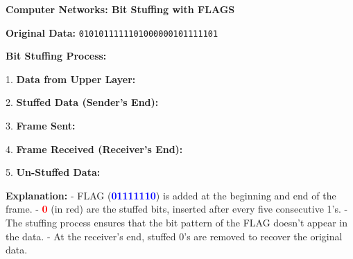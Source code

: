 \documentclass[12pt,a4paper]{article}
\newcommand{\bitstuff}[1]{\textcolor{red}{\textbf{#1}}}
\newcommand{\flag}[1]{\textcolor{blue}{\textbf{#1}}}
\begin{document}
\begin{center}
\textbf{Computer Networks: Bit Stuffing with FLAGS}
\end{center}

\textbf{Original Data:} \texttt{0101011111101000000101111101}

\textbf{Bit Stuffing Process:}

1. \textbf{Data from Upper Layer:}
   \begin{center}
   \end{center}

2. \textbf{Stuffed Data (Sender's End):}
   \begin{center}
   \end{center}

3. \textbf{Frame Sent:}
   \begin{center}
   \end{center}

4. \textbf{Frame Received (Receiver's End):}
   \begin{center}
   \end{center}

5. \textbf{Un-Stuffed Data:}
   \begin{center}
   \end{center}

\textbf{Explanation:}
- FLAG (\flag{01111110}) is added at the beginning and end of the frame.
- \bitstuff{0} (in red) are the stuffed bits, inserted after every five consecutive 1's.
- The stuffing process ensures that the bit pattern of the FLAG doesn't appear in the data.
- At the receiver's end, stuffed 0's are removed to recover the original data.
\end{document}
